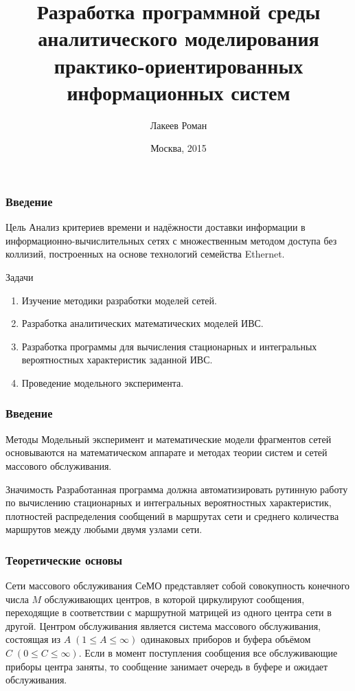 \documentclass[aspectratio=169]{beamer}
\title{Разработка программной среды аналитического моделирования практико-ориентированных информационных систем}
\author[Лакеев Р.Д.]{Лакеев Роман}
\institute[МГТУ <<СТАНКИН>>]{ФГБОУ ВПО МГТУ <<СТАНКИН>>}
\date{Москва, 2015}
\begin{document}
\maketitle

\begin{frame}
\frametitle{Введение}

\begin{block}{Цель}
Анализ критериев времени и надёжности доставки информации в информационно-вычислительных сетях с множественным методом доступа без коллизий, построенных на основе технологий семейства Ethernet.	
\end{block}

\begin{block}{Задачи}
\begin{enumerate}
	\item Изучение методики разработки моделей сетей.
	\item Разработка аналитических математических моделей ИВС.
	\item Разработка программы для вычисления стационарных и интегральных вероятностных характеристик заданной ИВС.
	\item Проведение модельного эксперимента.
\end{enumerate}
\end{block}
\end{frame}

\begin{frame}
\frametitle{Введение}

\begin{block}{Методы}
Модельный эксперимент и математические модели фрагментов сетей
основываются на математическом аппарате и методах теории систем и сетей массового обслуживания.
\end{block}

\begin{block}{Значимость}
Разработанная программа должна автоматизировать рутинную работу по вычислению стационарных и интегральных вероятностных характеристик, плотностей распределения сообщений в маршрутах сети и среднего количества маршрутов между любыми двумя узлами сети.
\end{block}

\end{frame}

\begin{frame}
\frametitle{Теоретические основы}

\begin{block}{Сети массового обслуживания}
СеМО представляет собой совокупность конечного числа \( M \) обслуживающих центров, в которой циркулируют сообщения,
переходящие в соответствии с маршрутной матрицей из одного центра сети в другой.
Центром обслуживания является система массового обслуживания, состоящая из \( A \; (1 \leqslant A \leqslant \infty) \) одинаковых приборов
и буфера объёмом \( C \; (0 \leqslant C \leqslant \infty) \). Если в момент поступления сообщения все обслуживающие приборы центра заняты, то сообщение занимает очередь в буфере и ожидает обслуживания.
\end{block}
\end{frame}
\end{document}

